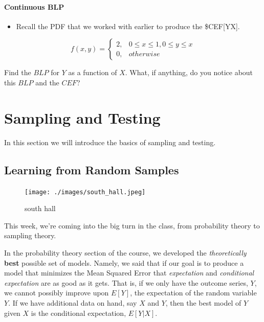\documentclass[
  letterpaper,
  DIV=11,
  numbers=noendperiod]{scrreprt}
\providecommand{\tightlist}{%
  \setlength{\itemsep}{0pt}\setlength{\parskip}{0pt}}\usepackage{longtable,booktabs,array}
\begin{document}
\subsection{Continuous BLP}\label{continuous-blp}

\begin{itemize}
\tightlist
\item
  Recall the PDF that we worked with earlier to produce the
  \$CEF{[}Y\textbar X{]}.
\end{itemize}

\[
f(x,y) = 
  \begin{cases}
    2, & 0 \leq x \leq 1, 0 \leq y \leq x \\
    0, & otherwise
\end{cases}
\]

Find the \(BLP\) for \(Y\) as a function of \(X\). What, if anything, do
you notice about this \(BLP\) and the \(CEF\)?

\vspace{20cm}

\part{Sampling and Testing}

In this section we will introduce the basics of sampling and testing.

\chapter{Learning from Random
Samples}\label{learning-from-random-samples}

\begin{figure}[H]

{\centering \texttt{[image: ./images/south\_hall.jpeg]}

}

\caption{south hall}

\end{figure}%

This week, we're coming into the big turn in the class, from probability
theory to sampling theory.

In the probability theory section of the course, we developed the
\emph{theoretically} \textbf{best} possible set of models. Namely, we
said that if our goal is to produce a model that minimizes the Mean
Squared Error that \emph{expectation} and \emph{conditional expectation}
are as good as it gets. That is, if we only have the outcome series,
\(Y\), we cannot possibly improve upon \(E[Y]\), the expectation of the
random variable \(Y\). If we have additional data on hand, say \(X\) and
\(Y\), then the best model of \(Y\) given \(X\) is the conditional
expectation, \(E[Y|X]\).
\end{document}
